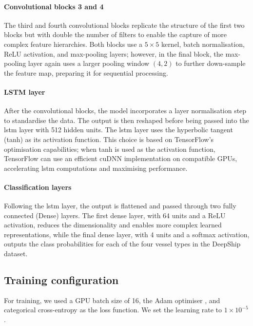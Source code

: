 \paragraph{Convolutional blocks 3 and 4} The third and fourth convolutional blocks replicate the structure of the first two blocks but with double the number of filters to enable the capture of more complex feature hierarchies. Both blocks use a $5\times5$ kernel, batch normalisation, ReLU activation, and max-pooling layers; however, in the final block, the max-pooling layer again uses a larger pooling window $(4, 2)$ to further down-sample the feature map, preparing it for sequential processing.

\paragraph{LSTM layer} After the convolutional blocks, the model incorporates a layer normalisation step to standardise the data. The output is then reshaped before being passed into the \acrshort{lstm} layer with 512 hidden units. The \acrshort{lstm} layer uses the hyperbolic tangent (tanh) as its activation function. This choice is based on TensorFlow's optimisation capabilities; when tanh is used as the activation function, TensorFlow can use an efficient cuDNN implementation on compatible GPUs, accelerating \acrshort{lstm} computations and maximising performance.

\paragraph{Classification layers} Following the \acrshort{lstm} layer, the output is flattened and passed through two fully connected (Dense) layers. The first dense layer, with 64 units and a ReLU activation, reduces the dimensionality and enables more complex learned representations, while the final dense layer, with 4 units and a softmax activation, outputs the class probabilities for each of the four vessel types in the DeepShip dataset.

\subsection{Training configuration}\label{subsec:training-configuration}

For training, we used a GPU batch size of 16, the Adam optimiser \cite{kingma_adam_2014}, and categorical cross-entropy as the loss function. We set the learning rate to $1 \times 10^{-5}$. 
 

